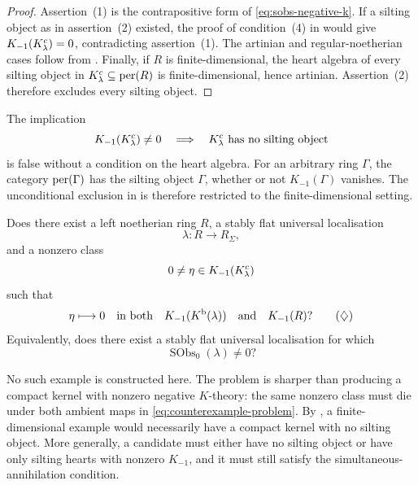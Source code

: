 \begin{proof}
Assertion~\textup{(1)} is the contrapositive form of \eqref{eq:sobs-negative-k}.  If a silting object as in assertion~\textup{(2)} existed, the proof of condition~\textup{(4)} in  would give \(K_{-1}(K^c_\lambda)=0\), contradicting assertion~\textup{(1)}.  The artinian and regular-noetherian cases follow from .  Finally, if \(R\) is finite-dimensional, the heart algebra of every silting object in \(K^c_\lambda\subseteq\operatorname{per}(R)\) is finite-dimensional, hence artinian.  Assertion~\textup{(2)} therefore excludes every silting object.
\end{proof}

\begin{remark}\label{rem:no-unrestricted-silting-obstruction}
The implication
\[
 K_{-1}(K^c_\lambda)\ne0
 \quad\Longrightarrow\quad
 K^c_\lambda\text{ has no silting object}
\]
is false without a condition on the heart algebra.  For an arbitrary ring \(\Gamma\), the category \(\operatorname{per}(\Gamma)\) has the silting object \(\Gamma\), whether or not \(K_{-1}(\Gamma)\) vanishes.  The unconditional exclusion in  is therefore restricted to the finite-dimensional setting.
\end{remark}

\begin{question}\label{question:negative-k-counterexample}
Does there exist a left noetherian ring \(R\), a stably flat universal localisation
\[
 \lambda:R\longrightarrow R_\Sigma,
\]
and a nonzero class
\[
 0\ne\eta\in K_{-1}(K^c_\lambda)
\]
such that
\[
 \eta\longmapsto0
 \quad\text{in both}\quad
 K_{-1}(K^{\mathrm b}(\lambda))
 \quad\text{and}\quad
 K_{-1}(R)?
\tag{\(\diamondsuit\)}\label{eq:counterexample-problem}
\]
Equivalently, does there exist a stably flat universal localisation for which
\[
 \operatorname{SObs}_0(\lambda)\ne0?
\]
\end{question}

No such example is constructed here.  The problem is sharper than producing a compact kernel with nonzero negative \(K\)-theory: the same nonzero class must die under both ambient maps in \eqref{eq:counterexample-problem}.  By , a finite-dimensional example would necessarily have a compact kernel with no silting object.  More generally, a candidate must either have no silting object or have only silting hearts with nonzero \(K_{-1}\), and it must still satisfy the simultaneous-annihilation condition.

